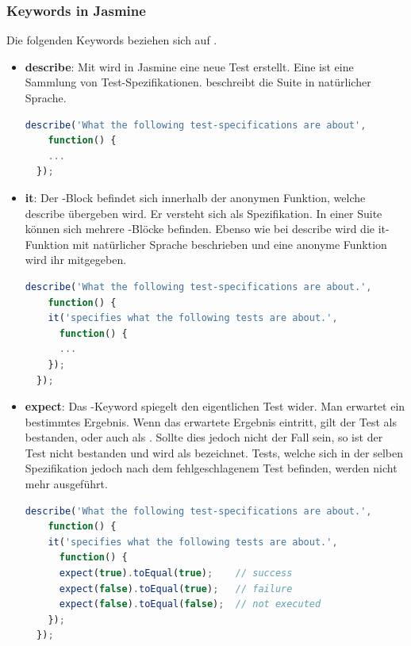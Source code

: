 \subsubsection{Keywords in Jasmine}
Die folgenden Keywords beziehen sich auf \cite[5-8]{Hahn:2013}.
\begin{itemize}
  \item \textbf{describe}:\newline
        Mit  wird in Jasmine eine neue Test  erstellt. Eine  ist eine Sammlung von Test-Spezifikationen.  beschreibt die Suite in natürlicher Sprache.
\begin{lstlisting}[language=JavaScript]
  describe('What the following test-specifications are about',
    function() {
    ...
  });
\end{lstlisting}
  \item \textbf{it}:\newline
        Der -Block befindet sich innerhalb der anonymen Funktion, welche describe übergeben wird. Er versteht sich als Spezifikation. In einer Suite können sich mehrere -Blöcke befinden. Ebenso wie bei describe wird die it-Funktion mit natürlicher Sprache beschrieben und eine anonyme Funktion wird ihr mitgegeben.
\begin{lstlisting}[language=JavaScript]
  describe('What the following test-specifications are about.',
    function() {
    it('specifies what the following tests are about.',
      function() {
      ...
    });
  });
\end{lstlisting}
  \item \textbf{expect}:\newline
        Das -Keyword spiegelt den eigentlichen Test wider. Man erwartet ein bestimmtes Ergebnis. Wenn das erwartete Ergebnis eintritt, gilt der Test als bestanden, oder auch als . Sollte dies jedoch nicht der Fall sein, so ist der Test nicht bestanden und wird als  bezeichnet. Tests, welche sich in der selben Spezifikation jedoch nach dem fehlgeschlagenem Test befinden, werden nicht mehr ausgeführt.
\begin{lstlisting}[language=JavaScript]
  describe('What the following test-specifications are about.',
    function() {
    it('specifies what the following tests are about.',
      function() {
      expect(true).toEqual(true);    // success
      expect(false).toEqual(true);   // failure
      expect(false).toEqual(false);  // not executed
    });
  });
\end{lstlisting}

\end{itemize}

